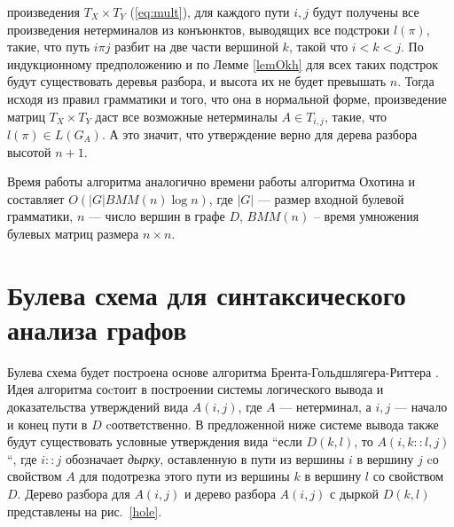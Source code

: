 \documentclass{spbau-diploma}
\begin{document}
произведения $T_X \times T_Y$ (\ref{eq:mult}), для каждого пути $i, j$ будут получены все
произведения нетерминалов из конъюнктов, выводящих все
подстроки $l(\pi)$, такие, что путь $i \pi j$ разбит на две части вершиной
$k$, такой что $i < k < j$. По индукционному предположению и по
Лемме \ref{lemOkh} для всех таких подстрок будут существовать деревья разбора, и высота их не будет превышать $n$. Тогда исходя из
правил грамматики и того, что она в нормальной форме,
произведение матриц $T_X \times T_Y$ даст все возможные нетерминалы $A \in T_{i,j}$, такие, что $l(\pi) \in L(G_A)$. А это значит, что утверждение верно
для дерева разбора высотой $n + 1$. 
\par
Время работы алгоритма аналогично времени работы алгоритма
Охотина \cite{OkhotinParse} и составляет $O(|G|BMM(n) \log n)$, где $|G|$ --- размер
входной булевой грамматики, $n$ --- число вершин в графе $D$,
$BMM(n)$ – время умножения булевых матриц размера $n \times n$.



\section {Булева схема для синтаксического анализа графов} 

Булева схема будет построена основе алгоритма Брента-Гольдшлягера-Риттера \cite{Brent}. Идея алгоритма соcтоит в построении системы логического вывода и доказательства утверждений вида $A(i, j)$, где $A$ --- нетерминал, а $i, j$ --- начало и конец пути в $D$ cоответственно. В предложенной ниже системе вывода также будут существовать условные утверждения вида ``если $D(k, l)$, то $A(i, k::l, j)$``, где $i::j$ обозначает \textit{дырку}, оставленную в пути из вершины $i$ в вершину $j$ cо свойством $A$ для подотрезка этого пути из вершины $k$ в вершину $l$ со свойством $D$. Дерево разбора для $A(i, j)$ и дерево разбора $A(i, j)$ с дыркой $D(k, l)$ представлены на рис.~\ref{hole}.
\end{document}
